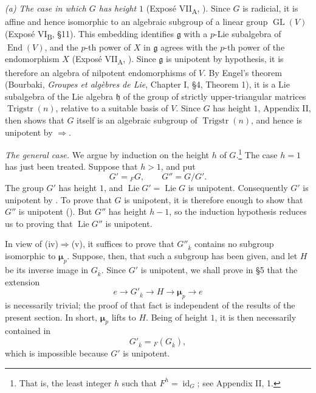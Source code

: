 \medskip\noindent\textit{(a) The case in which \(G\) has height
\(1\)} (Exposé VII\textsubscript{A}, ).
Since \(G\) is radicial, it is affine and hence isomorphic to an
algebraic subgroup of a linear group \(\operatorname{GL}(V)\)
(Exposé VI\textsubscript{B}, \S11).  This embedding identifies
\(\mathfrak g\) with a \(p\)-Lie subalgebra of
\(\operatorname{End}(V)\), and the \(p\)-th power of \(X\) in
\(\mathfrak g\) agrees with the \(p\)-th power of the endomorphism
\(X\) (Exposé VII\textsubscript{A}, ).  Since
\(\mathfrak g\) is unipotent by hypothesis, it is therefore an
algebra of nilpotent endomorphisms of \(V\).  By Engel's theorem
(Bourbaki, \emph{Groupes et algèbres de Lie}, Chapter I, \S4,
Theorem 1), it is a Lie subalgebra of the Lie algebra
\(\mathfrak h\) of the group of strictly upper-triangular matrices
\(\operatorname{Trigstr}(n)\), relative to a suitable basis of
\(V\).  Since \(G\) has height \(1\), Appendix II,  then shows
that \(G\) itself is an algebraic subgroup of
\(\operatorname{Trigstr}(n)\), and hence is unipotent by
\(\Rightarrow\).




\medskip\noindent\textit{ The general case.}\quad
We argue by induction on the height \(h\) of
\(G\).{\renewcommand{\thefootnote}{*}\footnote{That is, the least
integer \(h\) such that \(F^h=\operatorname{id}_G\); see
Appendix II, 1.}}
The case \(h=1\) has just been treated.  Suppose that \(h>1\), and
put
\[
  G'={}_{F}G,
  \qquad
  G''=G/G'.
\]
The group \(G'\) has height \(1\), and
\(\operatorname{Lie}G'=\operatorname{Lie}G\) is unipotent.
Consequently \(G'\) is unipotent by .  To prove that \(G\) is
unipotent, it is therefore enough to show that \(G''\) is unipotent
().  But \(G''\) has height \(h-1\), so the induction
hypothesis reduces us to proving that \(\operatorname{Lie}G''\) is
unipotent.

In view of (iv)\(\Rightarrow\)(v), it suffices to prove that
\(G''_{\overline{k}}\) contains no subgroup isomorphic to
\(\boldsymbol\mu_p\).  Suppose, then, that such a subgroup has been
given, and let \(H\) be its inverse image in
\(G_{\overline{k}}\).  Since \(G'\) is unipotent, we shall prove
in \S5 that the extension
\[
  e\longrightarrow G'_{\overline{k}}
   \longrightarrow H
   \longrightarrow\boldsymbol\mu_p
   \longrightarrow e
\]
is necessarily trivial; the proof of that fact is independent of
the results of the present section.  In short,
\(\boldsymbol\mu_p\) lifts to \(H\).  Being of height \(1\), it is
then necessarily contained in
\[
  G'_{\overline{k}}={}_{F}(G_{\overline{k}}),
\]
which is impossible because \(G'\) is unipotent.

